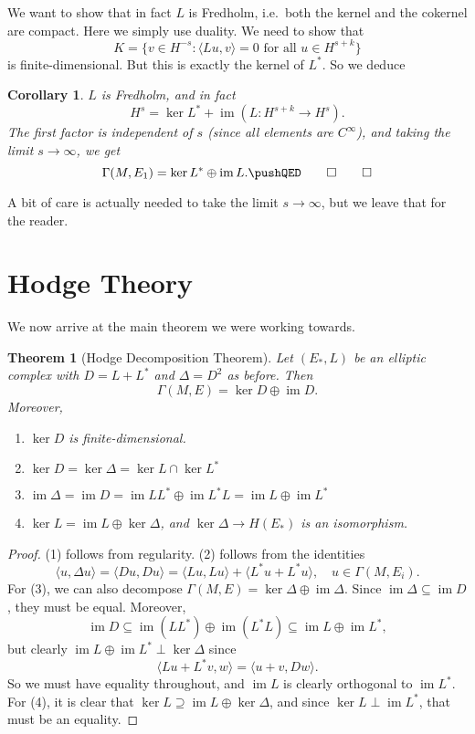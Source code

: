 \documentclass{shortart}
\newtheorem*{thm}{Theorem}
\newtheorem*{cor}{Corollary}
\theoremstyle{definition}
\newcommand\bra\langle
\newcommand\ket\rangle
\DeclareMathOperator\im{im}
\begin{document}
We want to show that in fact $L$ is Fredholm, i.e.\ both the kernel and the cokernel are compact. Here we simply use duality. We need to show that
\[
  K = \{v \in H^{-s} : \bra Lu, v\ket = 0\text{ for all }u \in H^{s + k}\}
\]
is finite-dimensional. But this is exactly the kernel of $L^*$. So we deduce
\begin{cor}
  $L$ is Fredholm, and in fact
  \[
    H^s = \ker L^* + \im (L: H^{s + k} \to H^s).
  \]
  The first factor is independent of $s$ (since all elements are $C^\infty$), and taking the limit $s \to \infty$, we get
  \[
    \Gamma(M, E_1) = \ker L^* \oplus \im L.\fakeqed
  \]\ifplastex\fakeqed\fi
\end{cor}
A bit of care is actually needed to take the limit $s \to \infty$, but we leave that for the reader.
\section{Hodge Theory}
We now arrive at the main theorem we were working towards.
\begin{thm}[Hodge Decomposition Theorem]
  Let $(E_*, L)$ be an elliptic complex with $D = L + L^*$ and $\Delta = D^2$ as before. Then
  \[
    \Gamma(M, E) = \ker D \oplus \im D.
  \]
  Moreover,
  \begin{enumerate}
    \item $\ker D$ is finite-dimensional.
    \item $\ker D = \ker \Delta = \ker L \cap \ker L^*$
    \item $\im \Delta = \im D = \im LL^* \oplus \im L^*L = \im L \oplus \im L^*$
    \item $\ker L = \im L \oplus \ker \Delta$, and $\ker \Delta \to H(E_*)$ is an isomorphism.
  \end{enumerate}
\end{thm}

\begin{proof}
  (1) follows from regularity. (2) follows from the identities
  \[
    \bra u, \Delta u\ket = \bra D u, D u\ket = \bra L u, L u\ket + \bra L^* u + L^* u\ket,\quad u \in \Gamma(M, E_i).
  \]
  For (3), we can also decompose $\Gamma(M, E) = \ker \Delta \oplus \im \Delta$. Since $\im \Delta \subseteq \im D$, they must be equal. Moreover,
  \[
    \im D \subseteq \im(LL^*) \oplus \im (L^*L) \subseteq \im L \oplus \im L^*,
  \]
  but clearly $\im L \oplus \im L^* \perp \ker \Delta$ since
  \[
    \bra L u + L^* v, w\ket = \bra u + v, D w\ket.
  \]
  So we must have equality throughout, and $\im L$ is clearly orthogonal to $\im L^*$. For (4), it is clear that $\ker L \supseteq \im L \oplus \ker \Delta$, and since $\ker L \perp \im L^*$, that must be an equality.
\end{proof}
\end{document}
